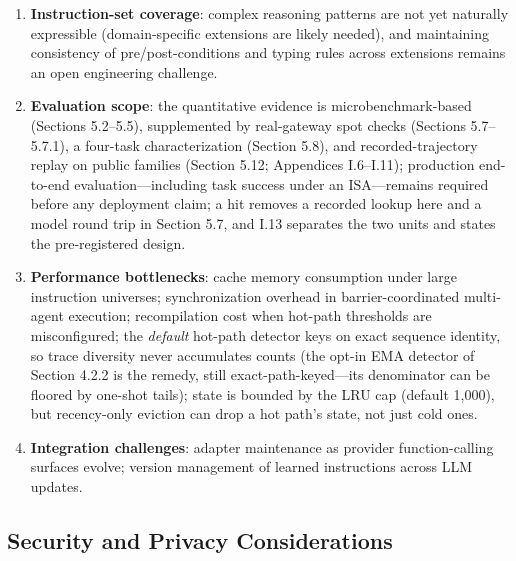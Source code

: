 \documentclass[
  sigconf,
  anonymous]{acmart}
\begin{document}
\begin{enumerate}
\def\labelenumi{\arabic{enumi}.}
\item
  \textbf{Instruction-set coverage}: complex reasoning patterns are not
  yet naturally expressible (domain-specific extensions are likely
  needed), and maintaining consistency of pre/post-conditions and typing
  rules across extensions remains an open engineering challenge.
\item
  \textbf{Evaluation scope}: the quantitative evidence is
  microbenchmark-based (Sections 5.2--5.5), supplemented by real-gateway
  spot checks (Sections 5.7--5.7.1), a four-task characterization
  (Section 5.8), and recorded-trajectory replay on public families
  (Section 5.12; Appendices I.6--I.11); production end-to-end
  evaluation---including task success under an ISA---remains required
  before any deployment claim; a hit removes a recorded lookup here and
  a model round trip in Section 5.7, and I.13 separates the two units
  and states the pre-registered design.
\item
  \textbf{Performance bottlenecks}: cache memory consumption under large
  instruction universes; synchronization overhead in barrier-coordinated
  multi-agent execution; recompilation cost when hot-path thresholds are
  misconfigured; the \emph{default} hot-path detector keys on exact
  sequence identity, so trace diversity never accumulates counts (the
  opt-in EMA detector of Section 4.2.2 is the remedy, still
  exact-path-keyed---its denominator can be floored by one-shot tails);
  state is bounded by the LRU cap (default 1,000), but recency-only
  eviction can drop a hot path's state, not just cold ones.
\item
  \textbf{Integration challenges}: adapter maintenance as provider
  function-calling surfaces evolve; version management of learned
  instructions across LLM updates.
\end{enumerate}

\subsection{Security and Privacy
Considerations}\label{security-and-privacy-considerations}
\end{document}

